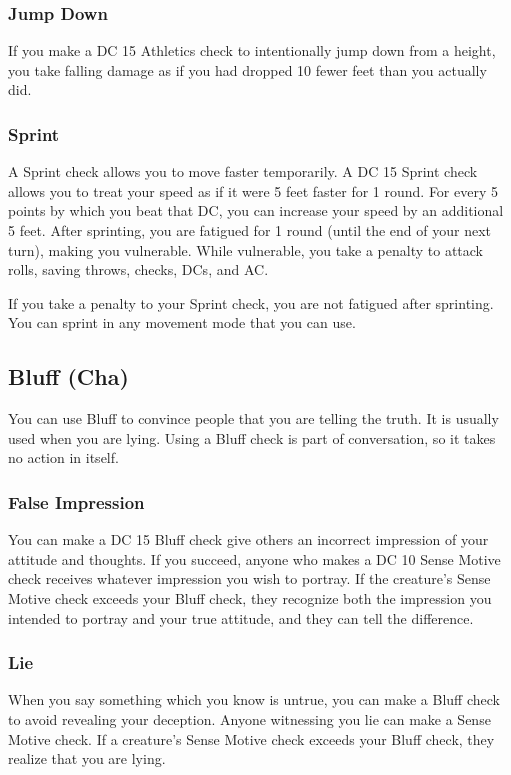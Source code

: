 \subsubsection{Jump Down}
If you make a DC 15 Athletics check to intentionally jump down from a height, you take falling damage as if you had dropped 10 fewer feet than you actually did.

\subsubsection{Sprint}

A Sprint check allows you to move faster temporarily. A DC 15 Sprint check allows you to treat your speed as if it were 5 feet faster for 1 round. For every 5 points by which you beat that DC, you can increase your speed by an additional 5 feet. After sprinting, you are fatigued for 1 round (until the end of your next turn), making you vulnerable. While vulnerable, you take a  penalty to attack rolls, saving throws, checks, DCs, and AC.

If you take a  penalty to your Sprint check, you are not fatigued after sprinting. You can sprint in any movement mode that you can use.

\subsection{Bluff (Cha)}
You can use Bluff to convince people that you are telling the truth. It is usually used when you are lying. Using a Bluff check is part of conversation, so it takes no action in itself.

\subsubsection{False Impression}
You can make a DC 15 Bluff check give others an incorrect impression of your attitude and thoughts. If you succeed, anyone who makes a DC 10 Sense Motive check receives whatever impression you wish to portray. If the creature's Sense Motive check exceeds your Bluff check, they recognize both the impression you intended to portray and your true attitude, and they can tell the difference.

\subsubsection{Lie}
When you say something which you know is untrue, you can make a Bluff check to avoid revealing your deception. Anyone witnessing you lie can make a Sense Motive check. If a creature's Sense Motive check exceeds your Bluff check, they realize that you are lying.

